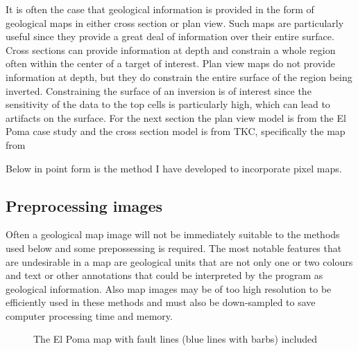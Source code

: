 It is often the case that geological information is provided in the form of geological maps in either cross section or plan view. Such maps are particularly useful since they provide a great deal of information over their entire surface. Cross sections can provide information at depth and constrain a whole region often within the center of a target of interest. Plan view maps do not provide information at depth, but they do constrain the entire surface of the region being inverted.  Constraining the surface of an inversion is of interest since the sensitivity of the data to the top cells is particularly high, which can lead to artifacts on the surface. For the next section the plan view model is from the El Poma case study and the cross section model is from TKC, specifically the map from \citep{harder2006geology}

Below in point form is the method I have developed to incorporate pixel maps.

\subsection{ Preprocessing images}
\label{subsec:Preprocessing images}

Often a geological map image will not be immediately suitable to the methods used below and some prepossessing is required. The most notable features that are undesirable in a map are geological units that are not only one or two colours and text or other annotations that could be interpreted by the program as geological information. Also map images may be of too high resolution to be efficiently used in these methods and must also be down-sampled to save  computer processing time and memory.

 \begin{figure} [h]
    \centering
    \caption{The El Poma map with fault lines (blue lines with barbs) included}
    \label{fig:ElPoma_GEOL_MagSus}
\end{figure}

